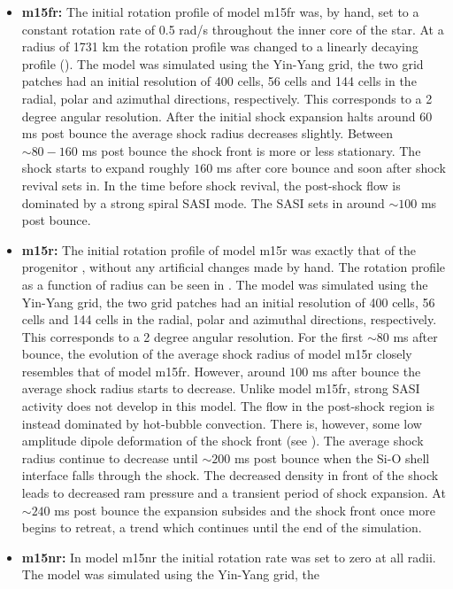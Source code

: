 \begin{itemize}
\item \textbf{m15fr:} The initial rotation profile of model m15fr was, by hand, set to a constant rotation rate of 0.5 rad/s
throughout the inner core of the star. At a radius of 1731 km the rotation profile was changed
to a linearly decaying profile (). The model was simulated using the 
Yin-Yang grid, the two grid patches had an initial resolution of 400 cells, 56 cells and 144 cells in the radial, polar and
azimuthal directions, respectively. This corresponds to a 2 degree angular resolution. 
After the initial shock expansion halts around $60$ ms post bounce the average shock radius decreases slightly.
Between $\sim 80 - 160$ ms post bounce the shock front is more or less stationary. 
The shock starts to expand roughly $160$ ms after core bounce and soon after shock revival sets in.
In the time before shock revival, the post-shock flow is dominated by a strong spiral SASI mode. The SASI sets in around
$\sim 100$ ms post bounce.
\item \textbf{m15r:} The initial rotation profile of model m15r was exactly that of the progenitor \citep{heger_05}, without
any artificial changes made by hand. The rotation profile as a function of radius can be seen in .  
The model was simulated using the Yin-Yang grid, the two grid patches had an initial resolution of 400 cells, 
56 cells and 144 cells in the radial, polar and azimuthal directions, respectively. This corresponds to a 2 degree angular resolution.
For the first $\sim 80$ ms after bounce, the evolution of the average shock radius of model m15r closely resembles that
of model m15fr. However, around $100$ ms after bounce the average shock radius starts to decrease. Unlike model m15fr, strong 
SASI activity does not develop in this model. The flow in the post-shock region is instead dominated by hot-bubble convection.
There is, however, some low amplitude dipole deformation of the shock front (see ).
The average shock radius continue to decrease until
$\sim 200$ ms post bounce when the Si-O shell interface falls through the shock. The decreased density in front of the shock leads
to decreased ram pressure and a transient period of shock expansion. At $\sim 240$ ms post bounce the expansion subsides and
the shock front once more begins to retreat, a trend which continues until the end of the simulation.  
\item \textbf{m15nr:} In model m15nr the initial rotation rate was set to zero at all radii. The model was simulated using the Yin-Yang grid, the

\end{itemize}
